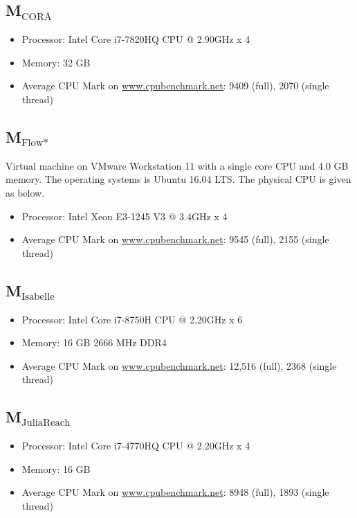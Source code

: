 \documentclass[EPiC]{easychair}
\begin{document}
\subsection{\texorpdfstring{M$_{\text{CORA}}$}{M-CORA}} \label{sec:machine:CORA}

\begin{itemize}
    \item Processor: Intel Core i7-7820HQ CPU @ 2.90GHz x 4 
    \item Memory: 32 GB
    \item Average CPU Mark on \url{www.cpubenchmark.net}: 9409 (full), 2070 (single thread)
\end{itemize}

\subsection{\texorpdfstring{M$_{\text{Flow*}}$}{M-Flow*}} \label{sec:machine:flowstar}
Virtual machine on VMware Workstation 11 with a single core CPU and 4.0 GB memory. The operating systems is Ubuntu 16.04 LTS. The physical CPU is given as below.
\begin{itemize}
 \item Processor: Intel Xeon E3-1245 V3 @ 3.4GHz x 4
 \item Average CPU Mark on \url{www.cpubenchmark.net}: 9545 (full), 2155 (single thread)
\end{itemize}

\subsection{\texorpdfstring{M$_{\text{Isabelle}}$}{M-Isabelle}} \label{sec:machine:isabelle}
\begin{itemize}
 \item Processor: Intel Core i7-8750H CPU @ 2.20GHz x 6
 \item Memory: 16 GB 2666 MHz DDR4
 \item Average CPU Mark on \url{www.cpubenchmark.net}: 12,516 (full), 2368 (single thread)
\end{itemize}

\subsection{\texorpdfstring{M$_{\text{JuliaReach}}$}{M-JuliaReach}} \label{sec:machine:juliareach}
\begin{itemize}
 \item Processor: Intel Core i7-4770HQ CPU @ 2.20GHz x 4
 \item Memory: 16 GB
 \item Average CPU Mark on \url{www.cpubenchmark.net}: 8948 (full), 1893 (single thread)
\end{itemize}
\end{document}
